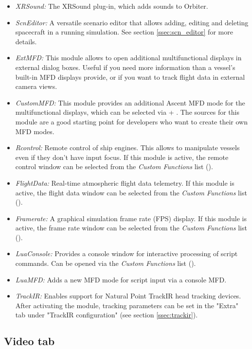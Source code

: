 \documentclass[Orbiter User Manual.tex]{subfiles}
\begin{document}
\begin{itemize}
	\item \emph{XRSound:} The XRSound plug-in, which adds sounds to Orbiter.
	\item \emph{ScnEditor:} A versatile scenario editor that allows adding,
		editing and deleting spacecraft in a running simulation. See section
		\ref{ssec:scn_editor} for more details.
	\item \emph{ExtMFD:} This module allows to open additional multifunctional
		displays in external dialog boxes. Useful if you need more information
		than a vessel's built-in MFD displays provide, or if you want to track
		flight data in external camera views.
	\item \emph{CustomMFD:} This module provides an additional Ascent MFD mode
		for the multifunctional displays, which can be selected via
		 + . The sources for this module are a good
		starting point for developers who want to create their own MFD modes.
	\item \emph{Rcontrol:} Remote control of ship engines. This allows to
		manipulate vessels even if they don't have input focus. If this module
		is active, the remote control window can be selected from the
		\emph{Custom Functions} list ().
	\item \emph{FlightData:} Real-time atmospheric flight data telemetry. If
		this module is active, the flight data window can be selected from the
		\emph{Custom Functions} list ().
	\item \emph{Framerate:} A graphical simulation frame rate (FPS) display. If
		this module is active, the frame rate window can be selected from the
		\emph{Custom Functions} list ().
	\item \emph{LuaConsole:} Provides a console window for interactive
		processing of script commands. Can be opened via the \emph{Custom
		Functions} list ().
	\item \emph{LuaMFD:} Adds a new MFD mode for script input via a console MFD.
	\item \emph{TrackIR:} Enables support for Natural Point TrackIR head
		tracking devices. After activating the module, tracking parameters can
		be set in the "Extra" tab under "TrackIR configuration" (see section
		\ref{ssec:trackir}).
\end{itemize}


\subsection{Video tab}
\label{ssec:launchpad_video}
\end{document}
